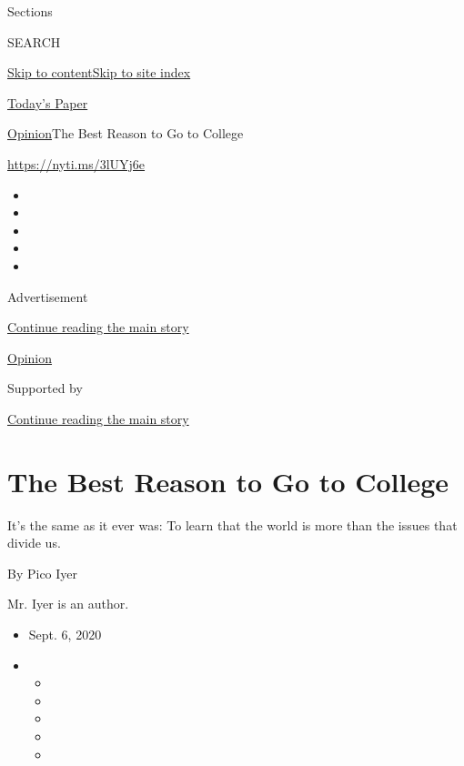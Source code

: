 Sections

SEARCH

\protect\hyperlink{site-content}{Skip to
content}\protect\hyperlink{site-index}{Skip to site index}

\href{https://myaccount.nytimes3xbfgragh.onion/auth/login?response_type=cookie\&client_id=vi}{}

\href{https://www.nytimes3xbfgragh.onion/section/todayspaper}{Today's
Paper}

\href{/section/opinion}{Opinion}\textbar{}The Best Reason to Go to
College

\url{https://nyti.ms/3lUYj6e}

\begin{itemize}
\item
\item
\item
\item
\item
\end{itemize}

Advertisement

\protect\hyperlink{after-top}{Continue reading the main story}

\href{/section/opinion}{Opinion}

Supported by

\protect\hyperlink{after-sponsor}{Continue reading the main story}

\hypertarget{the-best-reason-to-go-to-college}{%
\section{The Best Reason to Go to
College}\label{the-best-reason-to-go-to-college}}

It's the same as it ever was: To learn that the world is more than the
issues that divide us.

By Pico Iyer

Mr. Iyer is an author.

\begin{itemize}
\item
  Sept. 6, 2020
\item
  \begin{itemize}
  \item
  \item
  \item
  \item
  \item
  \end{itemize}
\end{itemize}

